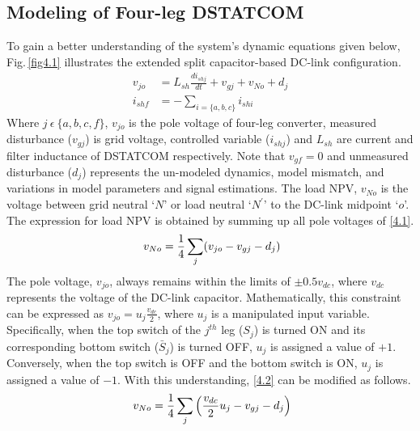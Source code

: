 \subsection{Modeling of Four-leg DSTATCOM}
To gain a better understanding of the system's dynamic equations given below, Fig.\,\ref{fig4.1} illustrates the extended split capacitor-based DC-link configuration.  
\begin{equation} \label{4.1}
	\begin{aligned}
		v_{jo} & = L_{sh}\frac{di_{shj}}{dt} + v_{gj} + v_{No} + d_{j}  \\
		i_{shf} & =	-\sum_{i=\{a,b,c\}} i_{shi} 	
	\end{aligned}
\end{equation}
Where $j ~ \epsilon ~ \{a,b,c,f\}$, $v_{jo}$ is the pole voltage of four-leg converter, measured disturbance ($v_{gj}$) is grid voltage, controlled variable ($i_{shj}$) and $L_{sh}$ are current and filter inductance of DSTATCOM respectively. Note that $v_{gf}=0$ and unmeasured disturbance ($ d_{j} $) represents the un-modeled dynamics, model mismatch, and variations in model parameters and signal estimations. The load NPV, $v_{No}$ is the voltage between grid neutral `$N$' or load neutral `$N^{\prime}$' to the DC-link midpoint `$o$'. The expression for load NPV is obtained by summing up all pole voltages of \eqref{4.1}. 
\begin{equation} \label{4.2}
	\ v_{No} = \frac{1}{4} \sum_{j} (v_{jo} - v_{gj} - d_{j}) \\
\end{equation}
The pole voltage, $v_{jo}$, always remains within the limits of $\pm0.5 v_{dc}$, where $v_{dc}$ represents the voltage of the DC-link capacitor. Mathematically, this constraint can be expressed as $ v_{jo} = u_{j}\frac{v_{dc}}{2} $, where $u_{j}$ is a manipulated input variable. Specifically, when the top switch of the $j^{th}$ leg ($S_{j}$) is turned ON and its corresponding bottom switch ($\bar{S}_{j}$) is turned OFF, $u_{j} $ is assigned a value of $+1$. Conversely, when the top switch is OFF and the bottom switch is ON, $u_{j} $ is assigned a value of $-1$. With this understanding, \eqref{4.2} can be modified as follows.
\begin{equation} \label{4.3}
	\ v_{No} = \frac{1}{4} \sum_{j}\Big(\frac{v_{dc}}{2} u_{j}  - v_{gj} - d_{j} \Big) \\
\end{equation}

